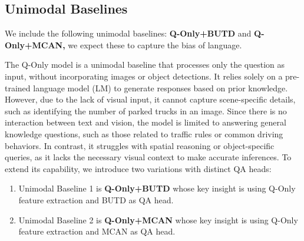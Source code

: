 \documentclass{article} %
\begin{document}
	
	
	

	\subsection{ Unimodal Baselines}
	We include the following unimodal baselines: \textbf{Q-Only+BUTD} and \textbf{Q-Only+MCAN,} we expect these to capture the bias of language.
	
	The Q-Only model is a unimodal baseline that processes only the question as input, without incorporating images or object detections. It relies solely on a pre-trained language model (LM) to generate responses based on prior knowledge. However, due to the lack of visual input, it cannot capture scene-specific details, such as identifying the number of parked trucks in an image. Since there is no interaction between text and vision, the model is limited to answering general knowledge questions, such as those related to traffic rules or common driving behaviors. In contrast, it struggles with spatial reasoning or object-specific queries, as it lacks the necessary visual context to make accurate inferences.  To extend its capability, we introduce two variations with distinct QA heads:
	
	\begin{enumerate}
		\item Unimodal Baseline 1 is \textbf{Q-Only+BUTD} whose key insight is using Q-Only feature extraction and BUTD as QA head.
		\item Unimodal Baseline 2 is \textbf{Q-Only+MCAN} whose key insight is using Q-Only feature extraction and MCAN as QA head.
	\end{enumerate}
	
\end{document}
